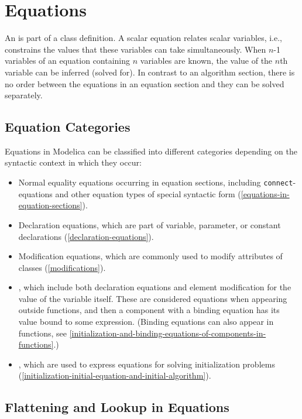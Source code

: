 \chapter{Equations}\label{equations}

An  is part of a class definition.
A scalar equation relates scalar variables, i.e., constrains the values that these variables can take simultaneously.
When $n$-1 variables of an equation containing $n$ variables are known, the value of the $n$th variable can be inferred (solved for).
In contrast to an algorithm section, there is no order between the equations in an equation section and they can be solved separately.

\section{Equation Categories}\label{equation-categories}

Equations in Modelica can be classified into different categories depending on the syntactic context in which they occur:
\begin{itemize}
\item
  Normal equality equations occurring in equation sections, including \lstinline!connect!-equations and other equation types of special syntactic form (\cref{equations-in-equation-sections}).
\item
  Declaration equations, which are part of variable, parameter, or constant declarations (\cref{declaration-equations}).
\item
  Modification equations, which are commonly used to modify attributes of classes (\cref{modifications}).
\item
  , which include both declaration equations and element modification for the value of the variable itself.
  These are considered equations when appearing outside functions, and then a component with a binding equation has its value bound to some expression.
  (Binding equations can also appear in functions, see \cref{initialization-and-binding-equations-of-components-in-functions}.)
\item
  , which are used to express equations for solving initialization problems (\cref{initialization-initial-equation-and-initial-algorithm}).
\end{itemize}


\section{Flattening and Lookup in Equations}\label{flattening-and-lookup-in-equations}

